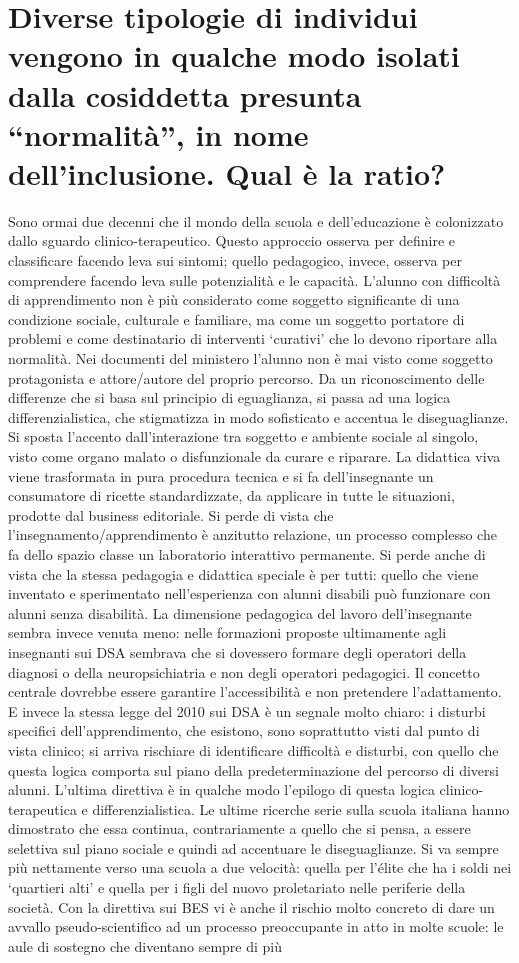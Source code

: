 \section*{Diverse tipologie di individui vengono in qualche modo isolati dalla cosiddetta presunta “normalità”, in nome dell'inclusione. Qual è la ratio?}
Sono ormai due decenni che il mondo della scuola e dell'educazione è colonizzato dallo sguardo clinico-terapeutico. Questo approccio osserva per definire e classificare facendo leva sui sintomi; quello pedagogico, invece, osserva per comprendere facendo leva sulle potenzialità e le capacità. L'alunno con difficoltà di apprendimento non è più considerato come soggetto significante di una condizione sociale, culturale e familiare, ma come un soggetto portatore di problemi e come destinatario di interventi ‘curativi’ che lo devono riportare alla normalità. Nei documenti del ministero l'alunno non è mai visto come soggetto protagonista e attore/autore del proprio percorso. Da un riconoscimento delle differenze che si basa sul principio di eguaglianza, si passa ad una logica differenzialistica, che stigmatizza in modo sofisticato e accentua le diseguaglianze. Si sposta l'accento dall'interazione tra soggetto e ambiente sociale al singolo, visto come organo malato o disfunzionale da curare e riparare. La didattica viva viene trasformata in pura procedura tecnica e si fa dell'insegnante un consumatore di ricette standardizzate, da applicare in tutte le situazioni, prodotte dal business editoriale. Si perde di vista che l'insegnamento/apprendimento è anzitutto relazione, un processo complesso che fa dello spazio classe un laboratorio interattivo permanente. Si perde anche di vista che la stessa pedagogia e didattica speciale è per tutti: quello che viene inventato e sperimentato nell'esperienza con alunni disabili può funzionare con alunni senza disabilità. La dimensione pedagogica del lavoro dell'insegnante sembra invece venuta meno: nelle formazioni proposte ultimamente agli insegnanti sui DSA sembrava che si dovessero formare degli operatori della diagnosi o della neuropsichiatria e non degli operatori pedagogici. Il concetto centrale dovrebbe essere garantire l'accessibilità e non pretendere l'adattamento. E invece la stessa legge del 2010 sui DSA è un segnale molto chiaro: i disturbi specifici dell'apprendimento, che esistono, sono soprattutto visti dal punto di vista clinico; si arriva rischiare di identificare difficoltà e disturbi, con quello che questa logica comporta sul piano della predeterminazione del percorso di diversi alunni. L'ultima direttiva è in qualche modo l'epilogo di questa logica clinico-terapeutica e differenzialistica. Le ultime ricerche serie sulla scuola italiana hanno dimostrato che essa continua, contrariamente a quello che si pensa, a essere selettiva sul piano sociale e quindi ad accentuare le diseguaglianze. Si va sempre più nettamente verso una scuola a due velocità: quella per l'élite che ha i soldi nei ‘quartieri alti’ e quella per i figli del nuovo proletariato nelle periferie della società. Con la direttiva sui BES vi è anche il rischio molto concreto di dare un avvallo pseudo-scientifico ad un processo preoccupante in atto in molte scuole: le aule di sostegno che diventano sempre di più 